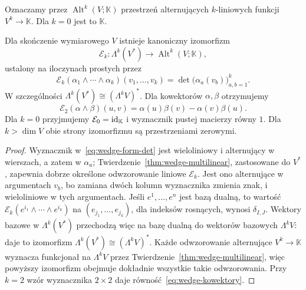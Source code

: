 Oznaczamy przez $\operatorname{Alt}^k(V;\mathbb K)$ przestrzeń
alternujących $k$-liniowych funkcji $V^k\to\mathbb K$.
Dla $k=0$ jest to $\mathbb K$.

\begin{twierdzenie}
\label{thm:dual-zewnetrzny}
Dla skończenie wymiarowego $V$ istnieje kanoniczny izomorfizm
\[
 \mathcal E_k\colon\Lambda^k(V^*)
 \longrightarrow\operatorname{Alt}^k(V;\mathbb K),
\]
ustalony na iloczynach prostych przez
\begin{equation}\label{eq:wedge-form-det}
 \mathcal E_k(\alpha_1\wedge\cdots\wedge\alpha_k)
 (v_1,\ldots,v_k)
 =\det\bigl(\alpha_a(v_b)\bigr)_{a,b=1}^k.
\end{equation}
W szczególności $\Lambda^k(V^*)\cong(\Lambda^k V)^*$.
Dla kowektorów $\alpha,\beta$ otrzymujemy
\begin{equation}\label{eq:wedge-kowektory}
 \mathcal E_2(\alpha\wedge\beta)(u,v)
 =\alpha(u)\beta(v)-\alpha(v)\beta(u).
\end{equation}
Dla $k=0$ przyjmujemy $\mathcal E_0=\mathrm{id}_{\mathbb K}$ i wyznacznik
pustej macierzy równy $1$. Dla $k>\dim V$ obie strony izomorfizmu
są przestrzeniami zerowymi.
\end{twierdzenie}
\begin{proof}
Wyznacznik w~\eqref{eq:wedge-form-det} jest wieloliniowy
i alternujący w wierszach, a zatem w $\alpha_a$;
Twierdzenie~\ref{thm:wedge-multilinear}, zastosowane do $V^*$,
zapewnia dobrze określone odwzorowanie liniowe $\mathcal E_k$.
Jest ono alternujące w argumentach $v_b$, bo zamiana dwóch
kolumn wyznacznika zmienia znak, i wieloliniowe w tych
argumentach. Jeśli $e^1,\ldots,e^n$ jest bazą dualną,
to wartość $\mathcal E_k(e^{i_1}\wedge\cdots\wedge e^{i_k})$
na $(e_{j_1},\ldots,e_{j_k})$, dla indeksów rosnących,
wynosi $\delta_{I,J}$. Wektory bazowe w
$\Lambda^k(V^*)$ przechodzą więc na bazę dualną do
wektorów bazowych $\Lambda^k V$: daje to izomorfizm
$\Lambda^k(V^*)\cong(\Lambda^k V)^*$.
Każde odwzorowanie alternujące $V^k\to\mathbb K$ wyznacza
funkcjonał na $\Lambda^k V$ przez
Twierdzenie~\ref{thm:wedge-multilinear}, więc powyższy
izomorfizm obejmuje dokładnie wszystkie takie odwzorowania.
Przy $k=2$ wzór wyznacznika $2\times2$ daje
równość~\eqref{eq:wedge-kowektory}.
\end{proof}

